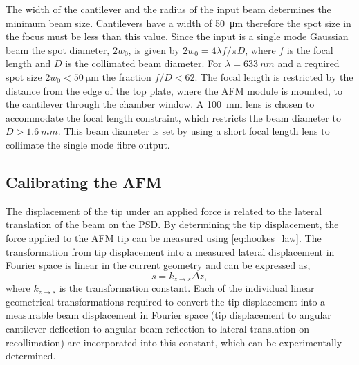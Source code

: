 \documentclass{article}
\begin{document}
The width of the cantilever and the radius of the input beam determines the minimum beam size. Cantilevers have a width of \SI{50}{\micro\metre} therefore the spot size in the focus must be less than this value. Since the input is a single mode Gaussian beam the spot diameter, $2w_0$, is given by $2w_0 = 4\lambda f/ \pi D$, where $f$ is the focal length and $D$ is the collimated beam diameter. For $\lambda=\SI{633}{nm}$ and a required spot size $2w_0 < \SI{50}{\micro\metre}$ the fraction $f/D < 62$. The focal length is restricted by the distance from the edge of the top plate, where the AFM module is mounted, to the cantilever through the chamber window. A \SI{100}{mm} lens is chosen to accommodate the focal length constraint, which restricts the beam diameter to $D > \SI{1.6}{mm}$. This beam diameter is set by using a short focal length lens to collimate the single mode fibre output.

\subsection{Calibrating the AFM}

The displacement of the tip under an applied force is related to the lateral translation of the beam on the PSD. By determining the tip displacement, the force applied to the AFM tip can be measured using \eqref{eq:hookes_law}. The transformation from tip displacement into a measured lateral displacement in Fourier space is linear in the current geometry and can be expressed as,
\begin{equation}
s = k_{z \rightarrow s}\Delta z,
\end{equation}
where $k_{z \rightarrow s}$ is the transformation constant. Each of the individual linear geometrical transformations required to convert the tip displacement into a measurable beam displacement in Fourier space (tip displacement to angular cantilever deflection to angular beam reflection to lateral translation on recollimation) are incorporated into this constant, which can be experimentally determined.
\end{document}

